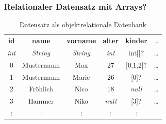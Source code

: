 \begin{frame}
    \frametitle{Relationaler Datensatz mit Arrays?}

    \begin{table}
        \centering
        \begin{adjustbox}{width=\textwidth}
            \small
            \begin{tabular}[c]{|c|c|c|c|c|c}

                \hline

                \multicolumn{1}{|c|}{\textbf{id}} &
                \multicolumn{1}{c|}{\textbf{name}} &
                \multicolumn{1}{c|}{\textbf{vorname}} &
                \multicolumn{1}{c|}{\textbf{alter}} &
                \multicolumn{1}{c|}{\textbf{kinder}} &
                \multicolumn{1}{c}{\dots} \\

                \multicolumn{1}{|c|}{\textit{int}} &
                \multicolumn{1}{c|}{\textit{String}} &
                \multicolumn{1}{c|}{\textit{String}} &
                \multicolumn{1}{c|}{\textit{int}} &
                \multicolumn{1}{c|}{\alert{int[]?}} &
                \multicolumn{1}{c}{\dots} \\

                \hline

                0  & Mustermann  & Max    & 27            & \alert{[0,1,2]?}  & \dots \\
                1  & Mustermann  & Marie  & 26            & \alert{[0]?}      & \dots \\
                2  & Fröhlich    & Nico   & 18            & \textit{null}     & \dots \\
                3  & Hammer      & Niko   & \textit{null} & \alert{[3]?}       & \dots \\
                $\vdots$ & $\vdots$ & $\vdots$ & $\vdots$ & $\vdots$ &

            \end{tabular}
        \end{adjustbox}
        \caption{Datensatz  als objektrelationale Datenbank}
        \label{tab:erwachsene2}
    \end{table}

\end{frame}


